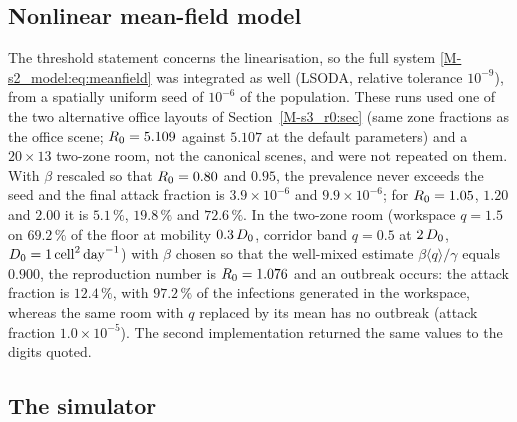 \subsection{Nonlinear mean-field model}\label{appA_numerics:sec:nonlinear}

The threshold statement concerns the linearisation, so the full system \eqref{M-s2_model:eq:meanfield} was
integrated as well (LSODA, relative tolerance $10^{-9}$), from a spatially uniform seed of $10^{-6}$ of the
population. These runs used one of the two alternative office layouts of Section~\ref{M-s3_r0:sec} (same zone
fractions as the office scene; $R_0=5.109$ against $5.107$ at the default parameters) and a $20\times13$
two-zone room, not the canonical scenes, and were not repeated on them.
With $\beta$ rescaled so that $R_0=0.80$ and $0.95$, the prevalence never exceeds the seed and the final
attack fraction is $3.9\times10^{-6}$ and $9.9\times10^{-6}$; for $R_0=1.05$, $1.20$ and $2.00$ it is
$5.1\,\%$, $19.8\,\%$ and $72.6\,\%$.
In the two-zone room (workspace $q=1.5$ on $69.2\,\%$ of the floor at mobility $0.3\,D_0$, corridor band
$q=0.5$ at $2\,D_0$, $D_0=1\,\mathrm{cell}^2\,\mathrm{day}^{-1}$) with $\beta$ chosen so that the well-mixed estimate
$\beta\langle q\rangle/\gamma$ equals $0.900$, the reproduction number is $R_0=1.076$ and an outbreak occurs:
the attack fraction is $12.4\,\%$, with $97.2\,\%$ of the infections generated in the workspace, whereas the
same room with $q$ replaced by its mean has no outbreak (attack fraction $1.0\times10^{-5}$).
The second implementation returned the same values to the digits quoted.

\subsection{The simulator}\label{appA_numerics:sec:algorithm}

